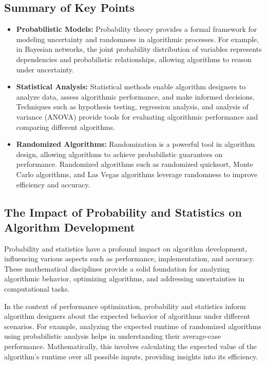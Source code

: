 \documentclass[12pt]{book} %
\begin{document}
\subsection{Summary of Key Points}
\begin{itemize}
    \item \textbf{Probabilistic Models:} Probability theory provides a formal framework for modeling uncertainty and randomness in algorithmic processes. For example, in Bayesian networks, the joint probability distribution of variables represents dependencies and probabilistic relationships, allowing algorithms to reason under uncertainty.
    
    \item \textbf{Statistical Analysis:} Statistical methods enable algorithm designers to analyze data, assess algorithmic performance, and make informed decisions. Techniques such as hypothesis testing, regression analysis, and analysis of variance (ANOVA) provide tools for evaluating algorithmic performance and comparing different algorithms.
    
    \item \textbf{Randomized Algorithms:} Randomization is a powerful tool in algorithm design, allowing algorithms to achieve probabilistic guarantees on performance. Randomized algorithms such as randomized quicksort, Monte Carlo algorithms, and Las Vegas algorithms leverage randomness to improve efficiency and accuracy.
\end{itemize}

\subsection{The Impact of Probability and Statistics on Algorithm Development}
Probability and statistics have a profound impact on algorithm development, influencing various aspects such as performance, implementation, and accuracy. These mathematical disciplines provide a solid foundation for analyzing algorithmic behavior, optimizing algorithms, and addressing uncertainties in computational tasks.

In the context of performance optimization, probability and statistics inform algorithm designers about the expected behavior of algorithms under different scenarios. For example, analyzing the expected runtime of randomized algorithms using probabilistic analysis helps in understanding their average-case performance. Mathematically, this involves calculating the expected value of the algorithm's runtime over all possible inputs, providing insights into its efficiency.
\end{document}
